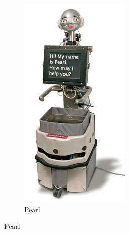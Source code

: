\begin{figure}[h]
        \centering
        \begin{subfigure}[h]{0.2\textwidth}
                \includegraphics[width=\textwidth]{./img/pearl}
                \caption{Pearl}
                \label{fig:pearl}
        \end{subfigure}

\end{figure}
